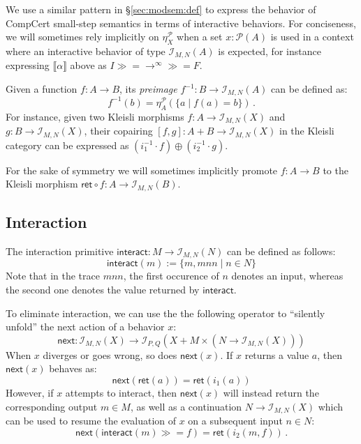 \documentclass[acmsmall,timestamp,review]{acmart}
\newcommand{\kw}[1]{\ensuremath{ \mathsf{#1} }}
\newcommand{\bind}{\gg\!\!=}
\begin{document}
We use a similar pattern in \S\ref{sec:modsem:def}
to express the behavior of CompCert small-step semantics
in terms of interactive behaviors.
For conciseness,
we will sometimes rely implicitly on $\eta_X^\mathcal{P}$
when a set $x : \mathcal{P}(A)$ is used
in a context where an interactive behavior
of type $\mathcal{I}_{M,N}(A)$ is expected,
for instance expressing $\llbracket \alpha \rrbracket$ above as
$I \bind {\rightarrow}^\infty \bind F$.

Given a function $f : A \rightarrow B$,
its \emph{preimage}
$f^{-1} : B \rightarrow \mathcal{I}_{M,N}(A)$
can be defined as:
\[
    f^{-1}(b) = \eta^\mathcal{P}_A(\{ a \mid f(a) = b \}) \,.
\]
For instance, given two Kleisli morphisms
$f : A \rightarrow \mathcal{I}_{M,N}(X)$ and
$g : B \rightarrow \mathcal{I}_{M,N}(X)$,
their copairing $[f, g] : A + B \rightarrow \mathcal{I}_{M,N}(X)$
in the Kleisli category can be expressed as
$(i_1^{-1} \cdot f) \oplus (i_2^{-1} \cdot g)$.

For the sake of symmetry we will sometimes implicitly promote
$f : A \rightarrow B$ to the Kleisli morphism
$\kw{ret} \circ f : A \rightarrow \mathcal{I}_{M,N}(B)$.


\subsection{Interaction} \label{sec:monad:int} %

The interaction primitive
$\kw{interact} : M \rightarrow \mathcal{I}_{M,N}(N)$
can be defined as follows:
\[
    \kw{interact}(m) := \{ m, mnn \mid n \in N \}
\]
Note that in the trace $mnn$,
the first occurence of $n$ denotes an input,
whereas the second one denotes the value returned by $\kw{interact}$.

To eliminate interaction,
we can use the the following operator to
``silently unfold'' the next action of a behavior $x$:
\[
    \kw{next} :
       \mathcal{I}_{M,N}(X) \rightarrow
       \mathcal{I}_{P,Q}(X + M \times (N \rightarrow \mathcal{I}_{M,N}(X)))
\]
When $x$ diverges or goes wrong, so does $\kw{next}(x)$.
If $x$ returns a value $a$, then $\kw{next}(x)$ behaves as:
\[
    \kw{next}(\kw{ret}(a)) = \kw{ret}(i_1(a))
\]
However,
if $x$ attempts to interact,
then $\kw{next}(x)$ will instead
return the corresponding output $m \in M$,
as well as a continuation $N \rightarrow \mathcal{I}_{M,N}(X)$
which can be used to resume the evaluation of $x$
on a subsequent input $n \in N$:
\[
    \kw{next}(\kw{interact}(m) \bind f) = \kw{ret}(i_2(m, f)) \,.
\]
\end{document}
